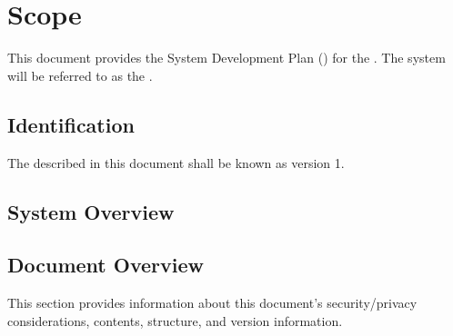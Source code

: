 
\chapter{Scope}
\label{loc:Scope}
% 

This document provides the System Development Plan (\SDP) for the \ThisSystem. 
The system will be referred to as the \ThisSys.

\section{Identification}
\label{loc:Identification}
% 

The \ThisSystem described in this document shall be known as \ThisSys version 1.


\section{System Overview}
\label{loc:SystemOverview}
% 




\section{Document Overview}
\label{loc:DocumentOverview}
% 

This section provides information about this document's security/privacy considerations, contents, structure, and version information.

% 

% 

% 
